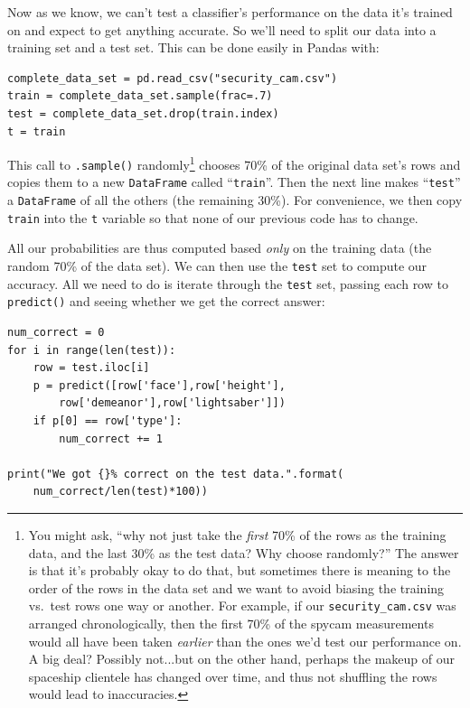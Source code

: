 Now as we know, we can't test a classifier's performance on the data it's
trained on and expect to get anything accurate. So we'll need to split our data
into a training set and a test set. This can be done easily in Pandas with:


\begin{Verbatim}[fontsize=\small,samepage=true,frame=single,framesep=3mm]
complete_data_set = pd.read_csv("security_cam.csv")
train = complete_data_set.sample(frac=.7)
test = complete_data_set.drop(train.index)
t = train
\end{Verbatim}


This call to \texttt{.sample()} randomly\footnote{You might ask, ``why not just
take the \textit{first} 70\% of the rows as the training data, and the last
30\% as the test data? Why choose randomly?'' The answer is that it's probably
okay to do that, but sometimes there is meaning to the order of the rows in the
data set and we want to avoid biasing the training vs.~test rows one way or
another. For example, if our \texttt{security\_cam.csv} was arranged
chronologically, then the first 70\% of the spycam measurements would all have
been taken \textit{earlier} than the ones we'd test our performance on. A big
deal? Possibly not...but on the other hand, perhaps the makeup of our spaceship
clientele has changed over time, and thus not shuffling the rows would lead to
inaccuracies.} chooses 70\% of the original data set's rows and copies them to
a new \texttt{DataFrame} called ``\texttt{train}''. Then the next line makes
``\texttt{test}'' a \texttt{DataFrame} of all the others (the remaining 30\%).
For convenience, we then copy \texttt{train} into the \texttt{t} variable so
that none of our previous code has to change.

All our probabilities are thus computed based \textit{only} on the training
data (the random 70\% of the data set). We can then use the \texttt{test} set
to compute our accuracy. All we need to do is iterate through the
\texttt{test} set, passing each row to \texttt{predict()} and seeing whether
we get the correct answer:

\label{evaluateNBcode}

\begin{Verbatim}[fontsize=\small,samepage=true,frame=single,framesep=3mm]
num_correct = 0
for i in range(len(test)):
    row = test.iloc[i]
    p = predict([row['face'],row['height'],
        row['demeanor'],row['lightsaber']])
    if p[0] == row['type']:
        num_correct += 1

print("We got {}% correct on the test data.".format(
    num_correct/len(test)*100))
\end{Verbatim}
\vspace{-.2in}

